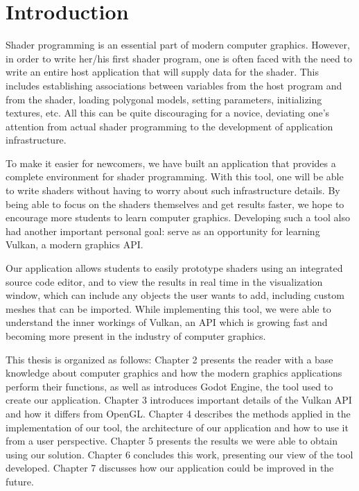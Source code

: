 \chapter{Introduction}

Shader programming is an essential part of modern computer graphics. However, in order to write her/his first shader program, one is often faced with the need to write an entire host application that will supply data for the shader. This includes establishing associations between variables from the host program and from the shader, loading polygonal models, setting parameters, initializing textures, etc.
All this can be quite discouraging for a novice, deviating one's attention from actual shader programming to the development of application infrastructure.

To make it easier for newcomers, we have built an application that provides a complete environment for shader programming. With this tool, one will be able to write shaders without having to worry about such infrastructure details. By being able to focus on the shaders themselves and get results faster, we hope to encourage more students to learn computer graphics. Developing such a tool also had another important personal goal: serve as an opportunity for learning Vulkan, a modern graphics API.

Our application allows students to easily prototype shaders using an integrated source code editor, and to view the results in real time in the visualization window, which can include any objects the user wants to add, including custom meshes that can be imported. While implementing this tool, we were able to understand the inner workings of Vulkan, an API which is growing fast and becoming more present in the industry of computer graphics.

This thesis is organized as follows: Chapter 2 presents the reader with a base knowledge about computer graphics and how the modern graphics applications perform their functions, as well as introduces Godot Engine, the tool used to create our application. Chapter 3 introduces important details of the Vulkan API and how it differs from OpenGL. Chapter 4 describes the methods applied in the implementation of our tool, the architecture of our application and how to use it from a user perspective. Chapter 5 presents the results we were able to obtain using our solution. Chapter 6 concludes this work, presenting our view of the tool developed. Chapter 7 discusses how our application could be improved in the future.

